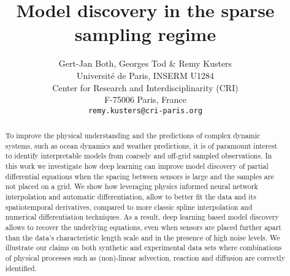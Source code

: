 \documentclass{article} %
\title{Model discovery in the sparse sampling regime}
\author{Gert-Jan Both, Georges Tod \& Remy Kusters  \\
Université de Paris, INSERM U1284 \\
Center for Research and Interdisciplinarity (CRI) \\
F-75006 Paris, France \\
\texttt{remy.kusters@cri-paris.org} \\
}
\begin{document}
\maketitle

\begin{abstract}

To improve the physical understanding and the predictions of complex dynamic systems, such as ocean dynamics and weather predictions, it is of paramount interest to identify interpretable models from coarsely and off-grid sampled observations. In this work we investigate how deep learning can improve model discovery of partial differential equations when the spacing between sensors is large and the samples are not placed on a grid. We show how leveraging physics informed neural network interpolation and automatic differentiation, allow to better fit the data and its spatiotemporal derivatives,  compared to more classic spline interpolation and numerical differentiation techniques. As a result, deep learning based model discovery allows to recover the underlying equations, even when sensors are placed further apart than the data’s characteristic length scale and in the presence of high noise levels. We illustrate our claims on both synthetic and experimental data sets where combinations of physical processes such as (non)-linear advection, reaction and diffusion are correctly identified.

\end{abstract}
\end{document}
